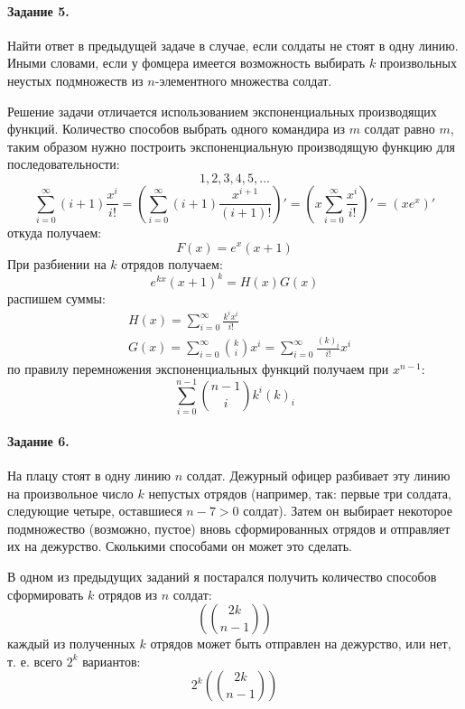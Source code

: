 \documentclass[a4paper,12pt]{article}
\begin{document}
\paragraph{Задание 5.} Найти ответ в предыдущей задаче в случае, если солдаты не стоят в одну линию. Иными словами, если у фомцера имеется возможность выбирать $k$ произвольных неустых подмножеств из $n$-элементного множества солдат.

\begin{Solution}
Решение задачи отличается использованием экспоненциальных производящих функций. Количество способов выбрать одного командира из $m$ солдат равно $m$, таким образом нужно построить экспоненциальную производящую функцию для последовательности:
\[
	1, 2, 3, 4, 5, ...
\]
\[
	\sum_{i=0}^{\infty} \left(i+1\right) \frac{x^i}{i!} = \left(\sum_{i=0}^{\infty} \left(i+1\right)\frac{x^{i+1}}{\left(i+1\right)!}\right)' = \left(x \sum_{i=0}^{\infty}\frac{x^i}{i!}\right)' = \left(x e^x\right)'
\]
откуда получаем:
\[
	F\left(x\right) = e^x \left(x+1\right)
\]
При разбиении на $k$ отрядов получаем:
\[
	e^{kx} \left(x+1\right)^k = H\left(x\right) G\left(x\right)
\]
распишем суммы:
\[
	\begin{split}
		& H\left(x\right) = \sum_{i=0}^{\infty} \frac{k^i x^i}{i!} \\
		& G\left(x\right) = \sum_{i=0}^{\infty} \binom{k}{i} x^i = \sum_{i=0}^{\infty} \frac{\left(k\right)_i}{i!} x^i
	\end{split}
\]
по правилу перемножения экспоненциальных функций получаем при $x^{n-1}$:
\[
	\sum_{i=0}^{n-1} \binom{n-1}{i} k^i \left(k\right)_i
\]
\end{Solution}

\paragraph{Задание 6.} На плацу стоят в одну линию $n$ солдат. Дежурный офицер разбивает эту линию на произвольное число $k$ непустых отрядов (например, так: первые три солдата, следующие четыре, оставшиеся $n-7>0$ солдат). Затем он выбирает некоторое подмножество (возможно, пустое) вновь сформированных отрядов и отправляет их на дежурство. Сколькими способами он может это сделать.

\begin{Solution}
В одном из предыдущих заданий я постарался получить количество способов сформировать $k$ отрядов из $n$ солдат:
\[
	\left(\binom{2k}{n-1}\right)
\]
каждый из полученных $k$ отрядов может быть отправлен на дежурство, или нет, т. е. всего $2^k$ вариантов:
\[
	2^k \left(\binom{2k}{n-1}\right)
\]
\end{Solution}
\end{document}
